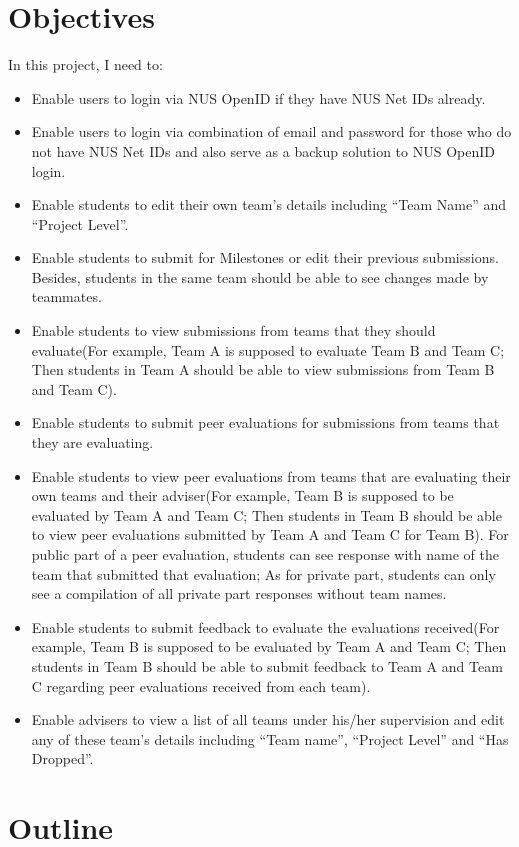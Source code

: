 \section{Objectives}

In this project, I need to:
\begin{itemize}
  \item Enable users to login via NUS OpenID if they have NUS Net IDs already.
  \item Enable users to login via combination of email and password for those who do not have NUS Net IDs and also serve as a backup solution to NUS OpenID login.
  \item Enable students to edit their own team's details including ``Team Name'' and ``Project Level''.
  \item Enable students to submit for Milestones or edit their previous submissions. Besides, students in the same team should be able to see changes made by teammates.
  \item Enable students to view submissions from teams that they should evaluate(For example, Team A is supposed to evaluate Team B and Team C; Then students in Team A should be able to view submissions from Team B and Team C).
  \item Enable students to submit peer evaluations for submissions from teams that they are evaluating.
  \item Enable students to view peer evaluations from teams that are evaluating their own teams and their adviser(For example, Team B is supposed to be evaluated by Team A and Team C; Then students in Team B should be able to view peer evaluations submitted by Team A and Team C for Team B). For public part of a peer evaluation, students can see response with name of the team that submitted that evaluation; As for private part, students can only see a compilation of all private part responses without team names.
  \item Enable students to submit feedback to evaluate the evaluations received(For example, Team B is supposed to be evaluated by Team A and Team C; Then students in Team B should be able to submit feedback to Team A and Team C regarding peer evaluations received from each team).
  \item Enable advisers to view a list of all teams under his/her supervision and edit any of these team's details including ``Team name'', ``Project Level'' and ``Has Dropped''.
\end{itemize}

\section{Outline}

